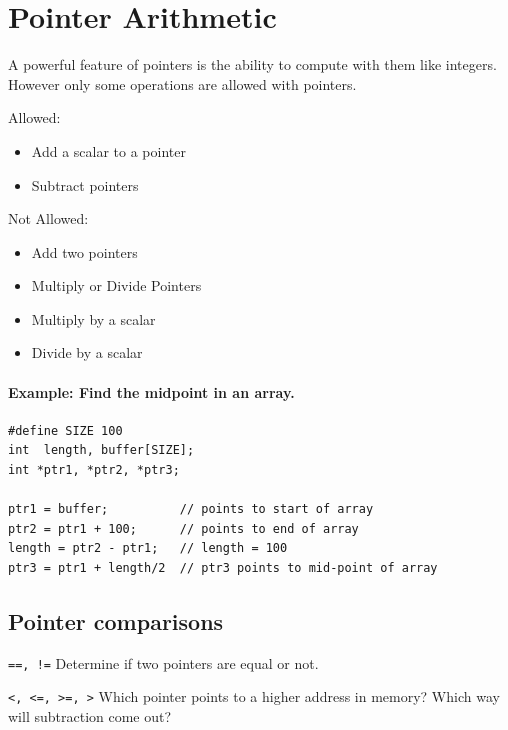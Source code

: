 \documentclass{article}	%
\begin{document}
\section{Pointer Arithmetic}

A powerful feature of pointers is the ability to compute with them like
integers.  However only some operations are allowed with pointers.

Allowed:
\begin{itemize}
  \item Add a scalar to a pointer
  \item Subtract pointers
\end{itemize}

Not Allowed:
\begin{itemize}
  \item Add two pointers
  \item Multiply or Divide Pointers
  \item Multiply by a scalar
  \item Divide by a scalar
\end{itemize}

\paragraph{Example: Find the midpoint in an array.}

\begin{verbatim}
#define SIZE 100
int  length, buffer[SIZE];
int *ptr1, *ptr2, *ptr3;

ptr1 = buffer;          // points to start of array
ptr2 = ptr1 + 100;      // points to end of array
length = ptr2 - ptr1;   // length = 100
ptr3 = ptr1 + length/2  // ptr3 points to mid-point of array

\end{verbatim}

\subsection{Pointer comparisons}

{\tt ==, !=} \hspace{0.5in} Determine if two pointers are equal or not.

{\tt <, <=, >=, >} \hspace{0.5in} Which pointer points to a higher
address in memory?  Which way will subtraction come out?
\end{document}
